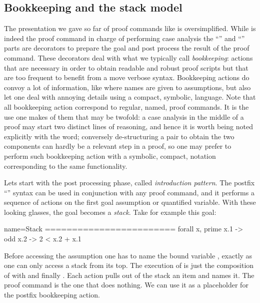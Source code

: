 \subsection{Bookkeeping and the stack model}

The presentation we gave so far of proof commands like 
is oversimplified.  While  is indeed the proof command in
charge of performing case analysis the ``'' and ``\C{=> [|m]}''
parts are decorators to prepare the goal and post process the result of
the proof command.  These decorators deal with what we typically call
\emph{bookkeeping}: actions that are necessary in order to obtain readable and
robust proof scripts but that are too frequent to benefit from a move verbose
syntax.  Bookkeeping actions do convoy a lot of information, like where
names are given to assumptions, but also let one deal with annoying details
using a compact, symbolic, language.  Note that all bookkeeping action
correspond to regular, named, proof commands.  It is the use one makes of them
that may be twofold: a case analysis in the middle of a proof may start two
distinct lines of reasoning, and hence it is worth being noted explicitly with
the  word; conversely de-structuring a pair to obtain the two
components can hardly be a relevant step in a proof, so one may prefer to
perform such bookkeeping action with a symbolic, compact, notation
corresponding to the same  functionality.


Lets start with the post processing phase, called \emph{introduction pattern}.
The postfix ``'' syntax can be used in conjunction with any proof
command, and it performs a sequence of actions on the first goal assumption or
quantified variable.  With these looking glasses, the goal becomes a
\emph{stack}. Take for example this goal:

\begin{coqout}{name=Stack}{}
========================
forall x, prime x.1 -> odd x.2 -> 2 < x.2 + x.1
\end{coqout}

Before accessing the assumption  one has to name the
bound variable , exactly as one can only access a stack from its top.
The execution of  is just the composition of
 with  and finally .  Each action
pulls out of the stack an item and names it.  The  proof
command is the one that does nothing.  We can use it as a placeholder
for the postfix \C{=>} bookkeeping action.


